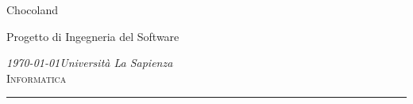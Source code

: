 \begin{titlepage}
    \noindent
    \titlefont Chocoland\par
    \epigraph{Progetto di Ingegneria del Software}%
    {\textit{\today \hfill Università La Sapienza}\\ \textsc{Informatica}}
    \null\vfill
    \vspace*{1cm}
    \noindent
    \hfill
    \begin{minipage}{0.75\linewidth}
        \begin{flushright}
            \printauthor
        \end{flushright}
    \end{minipage}
    \begin{minipage}{0.02\linewidth}
        \rule{1pt}{160pt}
    \end{minipage}
    \titlepagedecoration
\end{titlepage}